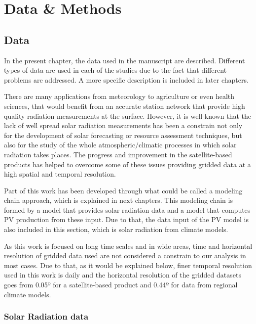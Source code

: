 \part{Data \& Methods\label{cha:datamethods}}

  
\chapter{Data\label{cha:Data}}

  In the present chapter, the data used in the manuscript are described. Different types of data are used in each of the studies due to the fact that different problems are addressed. A more specific description is included in later chapters.

  There are many applications from meteorology to agriculture or even health sciences, that would benefit from an accurate station network that provide high quality radiation measurements at the surface. However, it is well-known that the lack of  well spread solar radiation measurements has been a constrain not only for the development of solar forecasting or resource assessment techniques, but also for the study of the whole atmospheric/climatic processes in which solar radiation takes places. The progress and improvement in the satellite-based products has helped to overcome some of these issues providing gridded data at a high spatial and temporal resolution.

  Part of this work has been developed through what could be called a modeling chain approach, which is explained in next chapters. This modeling chain is formed by a model that provides solar radiation data and a model that computes PV production from these input. Due to that, the data input of the PV model is also included in this section, which is solar radiation from climate models.

As this work is focused on long time scales and in wide areas, time and horizontal resolution of gridded data used are not considered a constrain to our analysis in most cases. Due to that, as it would be explained below, finer temporal resolution used in this work is daily and the horizontal resolution of the gridded datasets goes from 0.05º for a satellite-based product and 0.44º for data from regional climate models.    
\section{Solar Radiation data}

